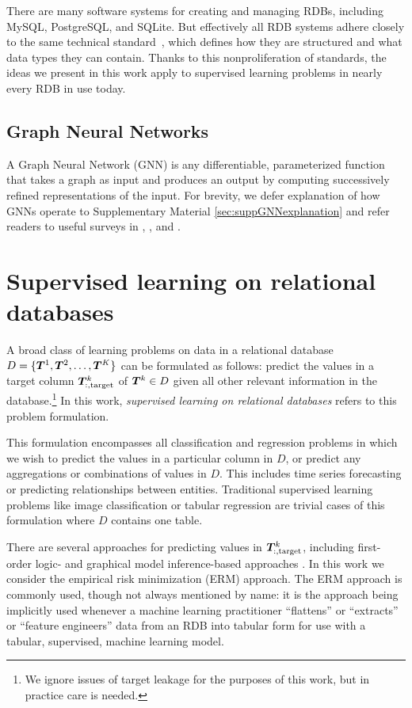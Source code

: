 \documentclass{article}
\begin{document}
There are many software systems for creating and managing RDBs, including MySQL, PostgreSQL, and SQLite.  But effectively all RDB systems adhere closely to the same technical standard~\citep{international_organization_for_standardization_iso/iec_2016}, which defines how they are structured and what data types they can contain.  Thanks to this nonproliferation of standards, the ideas we present in this work apply to supervised learning problems in nearly every RDB in use today.

\subsection{Graph Neural Networks}

A Graph Neural Network (GNN) is any differentiable, parameterized function that takes a graph as input and produces an output by computing successively refined representations of the input.  For brevity, we defer explanation of how GNNs operate to Supplementary Material \ref{sec:suppGNNexplanation} and refer readers to useful surveys in \cite{gilmer_neural_2017}, \cite{battaglia_relational_2018}, and \cite{wu_comprehensive_2019}.


\section{Supervised learning on relational databases}\label{sec:supervisedlearning}

A broad class of learning problems on data in a relational database $D = \{{\bm{T}}^1, {\bm{T}}^2, \ldots, {\bm{T}}^K\}$ can be formulated as follows: predict the values in a target column ${\bm{T}}^k_{:, \text{target}}$ of ${\bm{T}}^k \in D$ given all other relevant information in the database.\footnote{We ignore issues of target leakage for the purposes of this work, but in practice care is needed.}  In this work, \emph{supervised learning on relational databases} refers to this problem formulation.

This formulation encompasses all classification and regression problems in which we wish to predict the values in a particular column in $D$, or predict any aggregations or combinations of values in $D$.  This includes time series forecasting or predicting relationships between entities.  Traditional supervised learning problems like image classification or tabular regression are trivial cases of this formulation where $D$ contains one table.

There are several approaches for predicting values in ${\bm{T}}^k_{:, \text{target}}$, including first-order logic- and graphical model inference-based approaches \citep{getoor_introduction_2007}.  In this work we consider the empirical risk minimization (ERM) approach.  The ERM approach is commonly used, though not always mentioned by name: it is the approach being implicitly used whenever a machine learning practitioner ``flattens'' or ``extracts'' or ``feature engineers'' data from an RDB into tabular form for use with a tabular, supervised, machine learning model.
\end{document}
